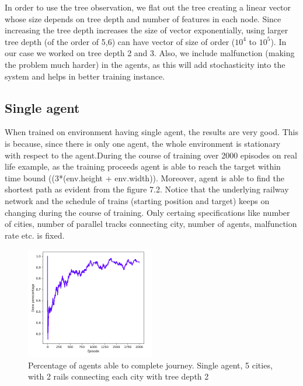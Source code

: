 \vspace{\baselineskip}
In order to use the tree observation, we flat out the tree creating a linear vector whose size depends on tree depth and 
number of features in each node. Since increasing the tree depth increases the size of vector exponentially,
using larger tree depth (of the order of 5,6) can have vector of size of order ($10^4$ to $10^5$).
 In our case we worked on tree depth 2 and 3. Also, we include malfunction (making the problem much harder) in the agents, as this will add 
 stochasticity into the system and helps in better training instance.


 \subsection{Single agent}
 When trained on environment having single agent, the results are very good. This is because, since there is only one 
 agent, the whole environment is stationary with respect to the agent.During the course of training over 2000 episodes on real life example,
 as the training proceeds agent is able to reach the target within time bound ((3*(env.height + env.width)). Moreover, 
 agent is able to find the shortest path as evident from the figure 7.2. Notice that the underlying railway network and
 the schedule of trains (starting position and target) keeps on changing during the course of training. Only certaing specifications
 like number of cities, number of parallel tracks connecting city, number of agents, malfunction rate etc. is fixed.

 \begin{figure}[h]
    \centering
    \includegraphics[width=0.5\textwidth]{single_agent_tree_observation_depth2}
    \caption{ Percentage of agents able to complete journey. Single agent, 5 cities, with 2 rails 
    connecting each city with tree depth 2 }
    \label{result10}
\end{figure}

